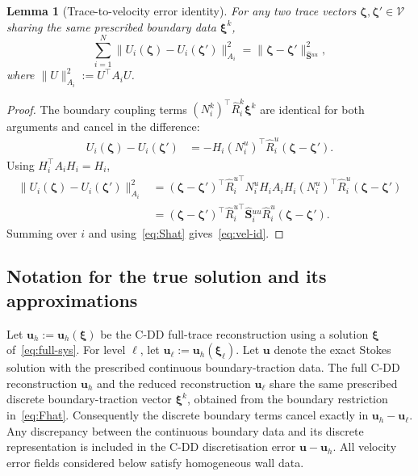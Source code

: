 \documentclass[11pt,a4paper]{article}
\newtheorem{lemma}[theorem]{Lemma}
\theoremstyle{definition}
\newcommand{\vel}{\bm{u}}
\newcommand{\Schur}{\mathbf{S}}
\newcommand{\Shatuu}{\widehat{\Schur}{}^{uu}}
\newcommand{\Vspace}{\mathcal{V}}
\begin{document}
\begin{lemma}[Trace-to-velocity error identity]\label{lem:vel-id}
  For any two trace vectors $\bm{\zeta},\bm{\zeta}'\in\Vspace$ sharing
  the same prescribed boundary data $\bm{\xi}^k$,
  \begin{equation}\label{eq:vel-id}
    \sum_{i=1}^N \|U_i(\bm{\zeta}) - U_i(\bm{\zeta}')\|_{A_i}^2
    = \|\bm{\zeta} - \bm{\zeta}'\|_{\Shatuu}^2,
  \end{equation}
  where $\|U\|_{A_i}^2 := U^\top A_i U$.
\end{lemma}

\begin{proof}
  The boundary coupling terms $(N_i^k)^\top \widehat{R}_i^k \bm{\xi}^k$
  are identical for both arguments and cancel in the difference:
  \begin{align*}
    U_i(\bm{\zeta}) - U_i(\bm{\zeta}')
    &= -H_i (N_i^u)^\top \widehat{R}_i^u (\bm{\zeta} - \bm{\zeta}').
  \end{align*}
  Using $H_i^\top A_i H_i = H_i$,
  \begin{align*}
    \|U_i(\bm{\zeta}) - U_i(\bm{\zeta}')\|_{A_i}^2
    &= (\bm{\zeta}-\bm{\zeta}')^\top \widehat{R}_i^{u\top}
       N_i^u H_i A_i H_i (N_i^u)^\top \widehat{R}_i^u
       (\bm{\zeta}-\bm{\zeta}') \\
    &= (\bm{\zeta}-\bm{\zeta}')^\top \widehat{R}_i^{u\top}
       \Shatuu_i \widehat{R}_i^u (\bm{\zeta}-\bm{\zeta}').
  \end{align*}
  Summing over $i$ and using~\eqref{eq:Shat} gives~\eqref{eq:vel-id}.
\end{proof}

\subsection{Notation for the true solution and its approximations}

Let $\vel_h := \vel_h(\bm{\xi})$ be the C-DD full-trace reconstruction
using a solution $\bm{\xi}$ of~\eqref{eq:full-sys}.
For level $\ell$, let $\vel_\ell := \vel_h(\bm{\xi}_\ell)$.
Let $\vel$ denote the exact Stokes solution with the prescribed
continuous boundary-traction data.  The full C-DD reconstruction
$\vel_h$ and the reduced reconstruction $\vel_\ell$ share the same
prescribed discrete boundary-traction vector $\bm{\xi}^k$, obtained
from the boundary restriction in~\eqref{eq:Fhat}.  Consequently the
discrete boundary terms cancel exactly in $\vel_h-\vel_\ell$.
Any discrepancy between the continuous boundary data and its discrete
representation is included in the C-DD discretisation error
$\vel-\vel_h$.
All velocity error fields considered below satisfy homogeneous
wall data.
\end{document}
